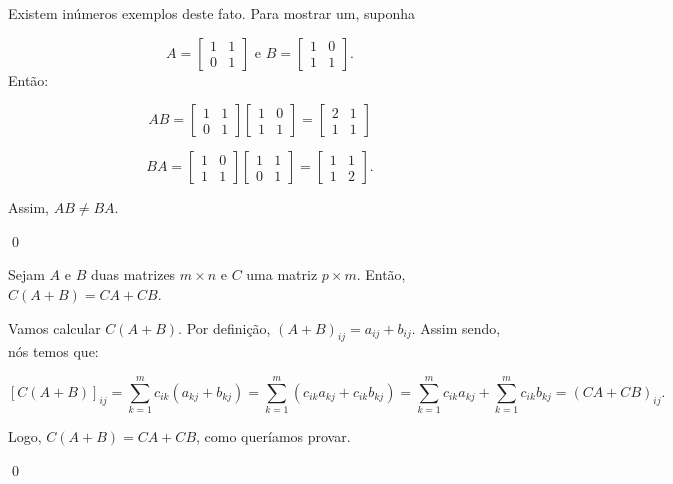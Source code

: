 \begin{Proof}
	Existem inúmeros exemplos deste fato. Para mostrar um, suponha
	
	$$
	A = \begin{bmatrix}
		1 & 1 \\
		0 & 1
	\end{bmatrix} \text{~e~}
	B = \begin{bmatrix}
		1 & 0 \\
		1 & 1
	\end{bmatrix}.
	$$
	Então:
	
	$$
	AB = \begin{bmatrix}
		1 & 1 \\
		0 & 1
	\end{bmatrix}
	\begin{bmatrix}
		1 & 0 \\
		1 & 1
	\end{bmatrix} = 
	\begin{bmatrix}
		2 & 1 \\
		1 & 1
	\end{bmatrix}
	$$
	
	$$
	BA = \begin{bmatrix}
		1 & 0 \\
		1 & 1
	\end{bmatrix}
	\begin{bmatrix}
		1 & 1 \\
		0 & 1
	\end{bmatrix} = 
	\begin{bmatrix}
		1 & 1 \\
		1 & 2
	\end{bmatrix}.
	$$
	
	Assim, $AB\neq BA$.
	
	\qed
\end{Proof}

\begin{Proposition}
	Sejam $A$ e $B$ duas matrizes $m\times n$ e $C$ uma matriz $p\times m$. Então, $C(A + B) = CA + CB$.
\end{Proposition}

\begin{Proof}
	Vamos calcular $C(A + B)$. Por definição, $(A + B)_{ij} = a_{ij} + b_{ij}$. Assim sendo, nós temos que:
	
	$$
	[C(A + B)]_{ij} = \sum\limits_{k = 1}^{m} c_{ik}(a_{kj} + b_{kj}) = \sum\limits_{k = 1}^{m} (c_{ik}a_{kj} + c_{ik}b_{kj}) = \sum\limits_{k = 1}^{m} c_{ik}a_{kj} + \sum\limits_{k = 1}^{m} c_{ik}b_{kj} = (CA + CB)_{ij}.
	$$
	
	Logo, $C(A + B) = CA + CB$, como queríamos provar.
	
	\qed
\end{Proof}

